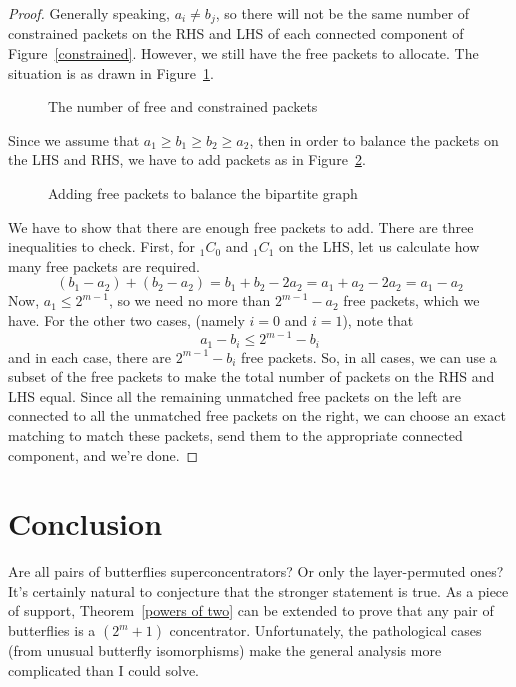 \documentclass[12pt]{article}
\begin{document}
\begin{proof}
Generally speaking, $a_{i}\neq b_{j}$, so there will not be the 
same number of constrained packets on the RHS and LHS of each
connected component of Figure~\ref{constrained}.  However, we
still have the free packets to allocate.  The situation is as drawn in
Figure~\ref{free 1}.
\begin{figure}[ht] 
\centerline{ \hspace{.4in}  }
\caption{The number of free and constrained packets} 
\label{free 1}
\end{figure}
Since we assume that $a_{1}\geq b_{1}\geq b_{2} \geq a_{2}$, then 
in order to balance the packets on the LHS and RHS, we have to
add packets as in Figure~\ref{free 2}.
\begin{figure}[ht]
\centerline{ \hspace{.4in}  }
\caption{Adding free packets to balance the bipartite graph}
\label{free 2}
\end{figure}
We have to show that there are enough free packets to add.
There are three inequalities to check.  First,
for $_{1}C_{0}$ and $_{1}C_{1}$ on the LHS,
let us calculate how many free packets are required.
\[(b_{1}-a_{2})+(b_{2}-a_{2}) = b_{1}+b_{2}-2a_{2}=a_{1}+a_{2}-2a_{2}
=a_{1}-a_{2}\]
Now, $a_{1}\leq 2^{m-1}$, so we need no more than $2^{m-1}-a_{2}$ 
free packets, which we have.
For the other two cases, (namely $i=0$ and $i=1$), note that
\[a_{1}-b_{i}\leq 2^{m-1}-b_{i}\]
and in each case, there are $2^{m-1}-b_{i}$ free packets.
So, in all cases, we can use a subset of the free packets to
make the total number of packets on the RHS and LHS equal.
Since all the remaining unmatched free packets on the left are
connected to all the unmatched free packets on the right, we can
choose an exact matching to match these packets, send them to
the appropriate connected component,
and we're done.
\end{proof}

\section{Conclusion}
Are all pairs of butterflies superconcentrators?  Or only the layer-permuted
ones?  It's certainly natural to conjecture that the stronger statement is
true.  As a piece of support, Theorem~\ref{powers of two} can be extended
to prove that any pair of butterflies is a $(2^{m}+1)$ concentrator.
Unfortunately, the pathological cases (from unusual butterfly isomorphisms)
make the general analysis more complicated than I could solve.
\end{document}
